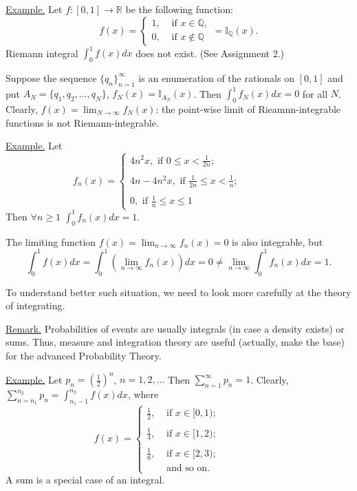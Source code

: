 \documentclass[a4paper,10pt]{article}
\def\RR{\mathbb{R}}
\def\QQ{\mathbb{Q}}
\def\II{\mathbb{I}}
\newcommand{\1}[1]{\mathbf{1}_{\{#1\}}}
\begin{document}
\underline{Example.} Let $f:[0,1]\to\RR$ be the following function:
  $$f(x)=\left\{\begin{array}{ll}
1, &\mbox{ if } x\in\QQ, \\ 0, & \mbox{ if } x\notin\QQ\end{array}\right. =\II_\QQ(x).$$
Riemann integral $\int_0^1 f(x) dx$ does not exist. (See Assignment 2.)

Suppose the sequence $\{q_n\}_{n=1}^\infty$ is an enumeration of the rationals on $[0,1]$ and put $A_N=\{q_1,q_2,\ldots, q_N\}$, $f_N(x)=\II_{A_N}(x)$. Then $\int_0^1 f_N(x)dx=0$ for all $N$. Clearly, $f(x)=\lim_{N\to\infty} f_N(x)$: the point-wise limit of Rieamnn-integrable functions is not Riemann-integrable.\vspace{3mm}

\underline{Example.} Let
  $$f_n(x)=\left\{\begin{array}{rl}
4n^2x, \mbox{ if } 0\le x<\frac{1}{2n}; \\ \\ 4n-4n^2x, \mbox{ if } \frac{1}{2n}\le x<\frac{1}{n}; \\ \\ 0, \mbox{ if } \frac{1}{n}\le x\le 1\end{array}\right. ~~~~~~~~~~~~~~~~~~~~$$
Then $\forall n\ge 1$ $\int_0^1 f_n(x)dx=1$.

The limiting function $f(x)=\lim_{n\to\infty} f_n(x)=0$ is also integrable, but
  $$\int_0^1 f(x)dx=\int_0^1(\lim_{n\to\infty} f_n(x)) dx=0\ne\lim_{n\to\infty} \int_0^1 f_n(x)dx=1.$$

To understand better such situation, we need to look more carefully at the theory of integrating.\vspace{3mm}

\underline{Remark.} Probabilities of events are usually integrals (in case a density exists) or sums. Thus, measure and integration theory are useful (actually, make the base) for the advanced Probability Theory.\vspace{3mm}

\underline{Example.}  Let $p_n=\left(\frac{1}{2}\right)^n$, $n=1,2,\ldots$ Then $\sum_{n=1}^\infty p_n=1$. Clearly,  $\sum_{n=n_1}^{n_2}p_n=\int_{n_1-1}^{n_2} f(x) dx$, where
  $$f(x)=\left\{\begin{array}{rl}
\frac{1}{2},& \mbox{ if } x\in[0,1); \\ \\ \frac{1}{4},& \mbox{ if }x\in[1,2); \\ \\ \frac{1}{8},& \mbox{ if }x\in[2,3);\\ & \mbox{ and so on. }\end{array}\right.~~~~~~~~~~~~~~~~~~~~$$
A sum is a special case of an integral.\vspace{10mm}
\end{document}

